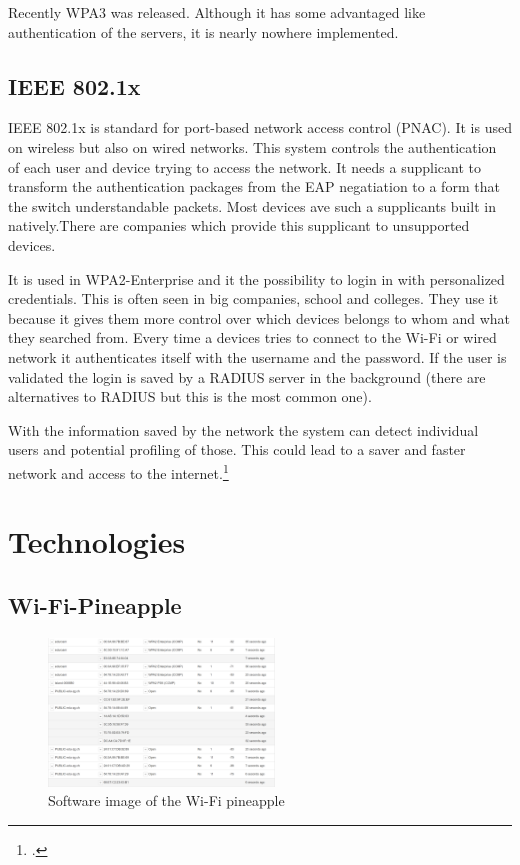\documentclass[11pt]{article}
\begin{document}
Recently WPA3 was released. Although it has some advantaged like authentication of the servers, it is nearly nowhere implemented. 

\subsection{IEEE 802.1x}
IEEE 802.1x is standard for port-based network access control (PNAC). It is used on wireless but also on wired networks. This system  controls the authentication of each user and device trying to access the network. It needs a supplicant to transform the authentication packages from the EAP negatiation to a form that the switch understandable packets. Most devices ave such a supplicants built in natively.There are companies which provide this supplicant to unsupported devices. 

It is used in WPA2-Enterprise and it the possibility to login in with personalized credentials. This is often seen in big companies, school and colleges. They use it because it gives them more control over which devices belongs to whom and what they searched from. Every time a devices tries to connect to the Wi-Fi or wired network it authenticates itself with the username and the password. If the user is validated the login is saved by a RADIUS server in the background (there are alternatives to RADIUS but this is the most common one).

With the information saved by the network the system can detect individual users and potential profiling of those. This could lead to a saver and faster network and access to the internet.\footcite{ieee802.1x}


\section{Technologies}
\subsection{Wi-Fi-Pineapple}
\begin{figure}
\centering
\includegraphics [width = 6cm]{images/example_wifi_pineapple.PNG}
\caption{Software image of the Wi-Fi pineapple\label{fig:wifi_pineapple}}
\end{figure}
\end{document}
